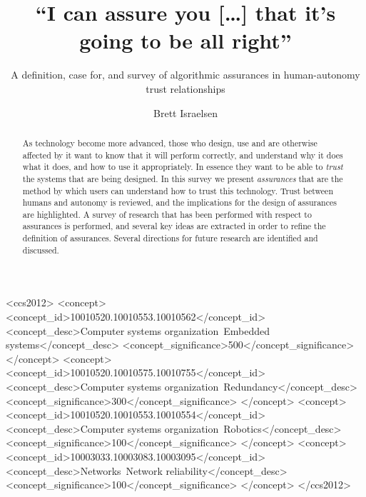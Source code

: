 \documentclass[manuscript, review, screen]{acmart}
\begin{document}
\title{``I can assure you [\ldots] that it's going to be all right''} 
 \subtitle{A definition, case for, and survey of algorithmic assurances in human-autonomy trust relationships}
\author{Brett Israelsen}

\begin{abstract}
    As technology become more advanced, those who design, use and are otherwise affected by it want to know that it will perform correctly, and understand why it does what it does, and how to use it appropriately. In essence they want to be able to \emph{trust} the systems that are being designed. In this survey we present \emph{assurances} that are the method by which users can understand how to trust this technology. Trust between humans and autonomy is reviewed, and the implications for the design of assurances are highlighted. A survey of research that has been performed with respect to assurances is performed, and several key ideas are extracted in order to refine the definition of assurances. Several directions for future research are identified and discussed.
\end{abstract}


%
%
\begin{CCSXML}
<ccs2012>
 <concept>
  <concept_id>10010520.10010553.10010562</concept_id>
  <concept_desc>Computer systems organization~Embedded systems</concept_desc>
  <concept_significance>500</concept_significance>
 </concept>
 <concept>
  <concept_id>10010520.10010575.10010755</concept_id>
  <concept_desc>Computer systems organization~Redundancy</concept_desc>
  <concept_significance>300</concept_significance>
 </concept>
 <concept>
  <concept_id>10010520.10010553.10010554</concept_id>
  <concept_desc>Computer systems organization~Robotics</concept_desc>
  <concept_significance>100</concept_significance>
 </concept>
 <concept>
  <concept_id>10003033.10003083.10003095</concept_id>
  <concept_desc>Networks~Network reliability</concept_desc>
  <concept_significance>100</concept_significance>
 </concept>
</ccs2012>  
\end{CCSXML}
\end{document}
